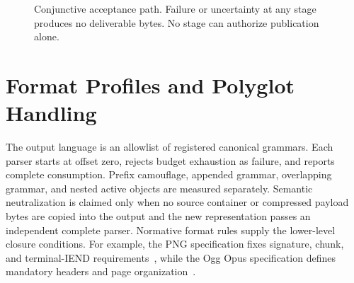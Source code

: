 \documentclass[preprint,12pt]{elsarticle}
\begin{document}
\begin{figure}[t]
\centering
{}
\caption{Conjunctive acceptance path. Failure or uncertainty at any stage
produces no deliverable bytes. No stage can authorize publication alone.}
\label{fig:acceptance-path}
\end{figure}

\section{Format Profiles and Polyglot Handling}\label{sec:formats}

The output language is an allowlist of registered canonical grammars. Each
parser starts at offset zero, rejects budget exhaustion as failure, and reports
complete consumption. Prefix camouflage, appended grammar, overlapping
grammar, and nested active objects are measured separately. Semantic
neutralization is claimed only when no source container or compressed payload
bytes are copied into the output and the new representation passes an
independent complete parser. Normative format rules supply the lower-level
closure conditions. For example, the PNG specification fixes signature, chunk,
and terminal-IEND requirements~\cite{png3}, while the Ogg Opus specification
defines mandatory headers and page organization~\cite{rfc7845}.
\end{document}
